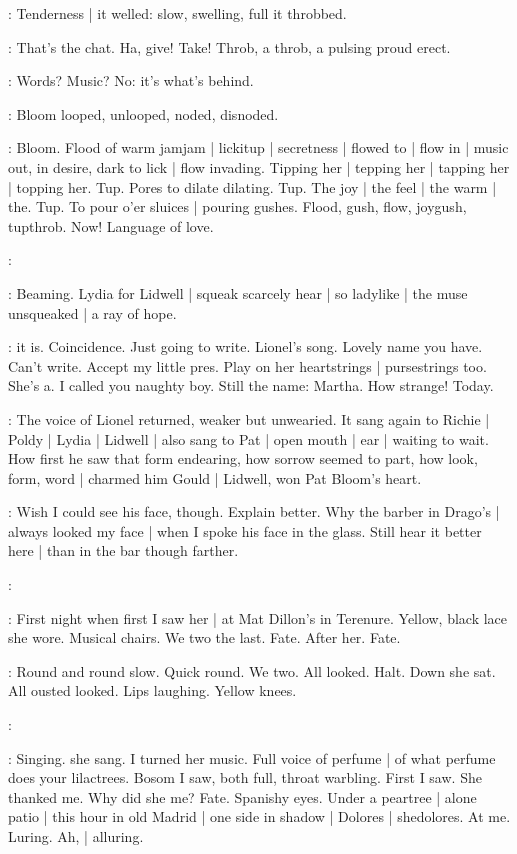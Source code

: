 :
Tenderness |
it welled:
slow,
swelling,
full it throbbed.

\BloomInt:
That's the chat.
Ha,
give!
Take!
Throb,
a throb,
a pulsing proud erect.

\BloomInt:
Words?
Music?
No:
it's what's behind.

:
Bloom looped,
unlooped,
noded,
disnoded.

\BloomInt:
Bloom.
Flood of warm jamjam |
lickitup |
secretness |
flowed to |
flow in |
music out,
in desire,
dark to lick |
flow invading.
Tipping her |
tepping her |
tapping her |
topping her.
Tup.
Pores to dilate dilating.
Tup.
The joy |
the feel |
the warm |
the.
Tup.
To pour o'er sluices |
pouring gushes.
Flood,
gush,
flow,
joygush,
tupthrob.
Now!
Language of love.

\simon:

:
Beaming.
Lydia for Lidwell |
squeak scarcely hear |
so ladylike |
the muse unsqueaked |
a ray of hope.

\BloomInt:
 it is.
Coincidence.
Just going to write.
Lionel's song.
Lovely name you have.
Can't write.
Accept my little pres.
Play on her heartstrings |
pursestrings too.
She's a.
I called you naughty boy.
Still the name:
Martha.
How strange!
Today.

:
The voice of Lionel returned,
weaker but unwearied.
It sang again to Richie |
Poldy |
Lydia |
Lidwell |
also sang to Pat |
open mouth |
ear |
waiting to wait.
How first he saw that form endearing,
how sorrow seemed to part,
how look,
form,
word |
charmed him
Gould |
Lidwell,
won Pat Bloom's heart.

\BloomInt:
Wish I could see his face,
though.
Explain better.
Why the barber in Drago's |
always looked my face |
when I spoke his face in the glass.
Still hear it better here |
than in the bar though farther.

\simon:

\BloomInt:
First night when first I saw her |
at Mat Dillon's in Terenure.
Yellow,
black lace she wore.
Musical chairs.
We two the last.
Fate.
After her.
Fate.

\BloomInt:
Round and round slow.
Quick round.
We two.
All looked.
Halt.
Down she
sat.
All ousted looked.
Lips laughing.
Yellow knees.

\simon:

\BloomInt:
Singing.
 she sang.
I turned her music.
Full voice of perfume |
of what perfume does your lilactrees.
Bosom I saw,
both full,
throat warbling.
First I saw.
She thanked me.
Why did she me?
Fate.
Spanishy eyes.
Under a peartree |
alone patio |
this hour in old Madrid |
one side in shadow |
Dolores |
shedolores.
At me.
Luring.
Ah, |
alluring.


